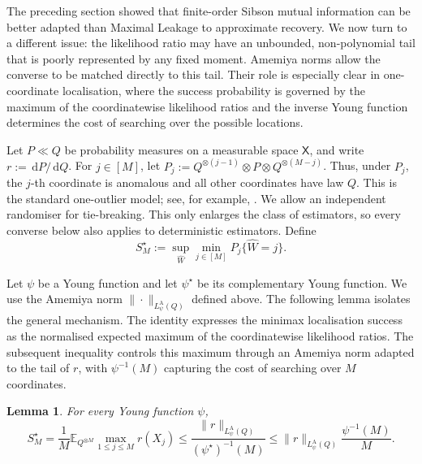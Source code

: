 \documentclass[11pt]{article}
\newtheorem{lemma}[theorem]{Lemma}
\theoremstyle{definition}
\theoremstyle{remark}
\newcommand{\Ee}{\mathbb E}
\newcommand{\1}{\boldsymbol{1}}
\newcommand{\dd}{\,\mathrm d}
\begin{document}
The preceding section showed that finite-order Sibson mutual information can be
better adapted than Maximal Leakage to approximate recovery. We now turn to
a different issue: the likelihood ratio may have an unbounded, non-polynomial
tail that is poorly represented by any fixed moment. Amemiya norms
allow the converse to be matched directly to this tail. Their role is
especially clear in one-coordinate localisation, where the success
probability is governed by the maximum of the coordinatewise likelihood
ratios and the inverse Young function determines the cost of searching over
the possible locations.

Let \(P\ll Q\) be probability measures on a measurable space
\(\mathsf X\), and write \(r:=\dd P/\dd Q\). For \(j\in[M]\), let
\(P_j:=Q^{\otimes(j-1)}\otimes P\otimes Q^{\otimes(M-j)}\). Thus, under
\(P_j\), the \(j\)-th coordinate is anomalous and all other coordinates have
law \(Q\). This is the standard one-outlier model; see, for example,
\cite{LiNitinawaratVeeravalli2014}. We allow an independent randomiser for
tie-breaking. This only enlarges the class of estimators, so every converse
below also applies to deterministic estimators. Define
\begin{equation}
S_M^\star
:=
\sup_{\widehat W}\min_{j\in[M]}P_j\{\widehat W=j\}.
\label{eq:oneCoordinateSuccess}
\end{equation}

Let \(\psi\) be a Young function and let \(\psi^\star\) be its complementary
Young function. We use the Amemiya norm
\(\|\cdot\|_{L_\psi^{\mathrm A}(Q)}\) defined above. The following lemma
isolates the general mechanism. The identity expresses the minimax
localisation success as the normalised expected maximum of the coordinatewise
likelihood ratios. The subsequent inequality controls this maximum through
an Amemiya norm adapted to the tail of \(r\), with
\(\psi^{-1}(M)\) capturing the cost of searching over \(M\) coordinates.

\begin{lemma}
\label{lem:oneCoordinateAmemiya}
For every Young function \(\psi\),
\begin{equation}
S_M^\star
=
\frac1M\Ee_{Q^{\otimes M}}
\max_{1\le j\le M}r(X_j)
\le
\frac{\|r\|_{L_\psi^{\mathrm A}(Q)}}
     {(\psi^\star)^{-1}(M)}
\le
\|r\|_{L_\psi^{\mathrm A}(Q)}
\frac{\psi^{-1}(M)}{M}.
\label{eq:oneCoordinateAmemiya}
\end{equation}
\end{lemma}
\end{document}
